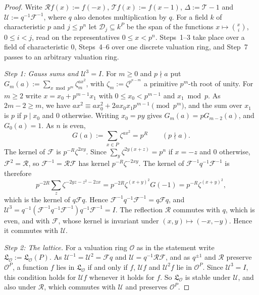 \documentclass[11pt]{amsart}
\numberwithin{equation}{section}
\theoremstyle{plain}
\theoremstyle{definition}
\theoremstyle{remark}
\begin{document}
\begin{proof}
Write \(\mathcal Rf(x):=f(-x)\), \(\mathcal Tf(x):=f(x-1)\), \(\Delta:=\mathcal T-1\) and \(\mathcal U:=q^{-1}\mathcal F^{-1}\), where \(q\) also denotes multiplication by \(q\). For a field \(k\) of characteristic \(p\) and \(j\le p^n\) let \(\mathcal D_j\subseteq k^P\) be the span of the functions \(x\mapsto\binom xi\), \(0\le i<j\), read on the representatives \(0\le x<p^n\). Steps~1--3 take place over a field of characteristic \(0\), Steps~4--6 over one discrete valuation ring, and Step~7 passes to an arbitrary valuation ring.

\emph{Step 1: Gauss sums and \(\mathcal U^3=I\).} For \(m\ge0\) and \(p\nmid a\) put \(G_m(a):=\sum_{x\bmod p^m}\zeta_m^{ax^2}\), with \(\zeta_m:=\zeta^{p^{n-m}}\) a primitive \(p^m\)-th root of unity. For \(m\ge2\) write \(x=x_0+p^{m-1}x_1\) with \(0\le x_0<p^{m-1}\) and \(x_1\bmod p\). As \(2m-2\ge m\), we have \(ax^2\equiv ax_0^2+2ax_0x_1p^{m-1}\pmod{p^m}\), and the sum over \(x_1\) is \(p\) if \(p\mid x_0\) and \(0\) otherwise. Writing \(x_0=py\) gives \(G_m(a)=pG_{m-2}(a)\), and \(G_0(a)=1\). As \(n\) is even,
\[G(a):=\sum_{x\in P}\zeta^{ax^2}=p^R\qquad(p\nmid a).\]
The kernel of \(\mathcal F\) is \(p^{-R}\zeta^{2xy}\). Since \(\sum_y\zeta^{2y(x+z)}=p^n\) if \(x=-z\) and \(0\) otherwise, \(\mathcal F^2=\mathcal R\), so \(\mathcal F^{-1}=\mathcal R\mathcal F\) has kernel \(p^{-R}\zeta^{-2xy}\). The kernel of \(\mathcal F^{-1}q^{-1}\mathcal F^{-1}\) is therefore
\[p^{-2R}\sum_z\zeta^{-2yz-z^2-2zx}=p^{-2R}\zeta^{(x+y)^2}G(-1)=p^{-R}\zeta^{(x+y)^2},\]
which is the kernel of \(q\mathcal Fq\). Hence \(\mathcal F^{-1}q^{-1}\mathcal F^{-1}=q\mathcal Fq\), and \(\mathcal U^3=q^{-1}(\mathcal F^{-1}q^{-1}\mathcal F^{-1})q^{-1}\mathcal F^{-1}=I\). The reflection \(\mathcal R\) commutes with \(q\), which is even, and with \(\mathcal F\), whose kernel is invariant under \((x,y)\mapsto(-x,-y)\). Hence it commutes with \(\mathcal U\).

\emph{Step 2: The lattice.} For a valuation ring \(\mathcal O\) as in the statement write \(\mathfrak L_{\mathcal O}:=\mathfrak L_{\mathcal O}(P)\). As \(\mathcal U^{-1}=\mathcal U^2=\mathcal Fq\) and \(\mathcal U=q^{-1}\mathcal R\mathcal F\), and as \(q^{\pm1}\) and \(\mathcal R\) preserve \(\mathcal O^P\), a function \(f\) lies in \(\mathfrak L_{\mathcal O}\) if and only if \(f\), \(\mathcal Uf\) and \(\mathcal U^2f\) lie in \(\mathcal O^P\). Since \(\mathcal U^3=I\), this condition holds for \(\mathcal Uf\) whenever it holds for \(f\). So \(\mathfrak L_{\mathcal O}\) is stable under \(\mathcal U\), and also under \(\mathcal R\), which commutes with \(\mathcal U\) and preserves \(\mathcal O^P\).


\end{proof}
\end{document}
